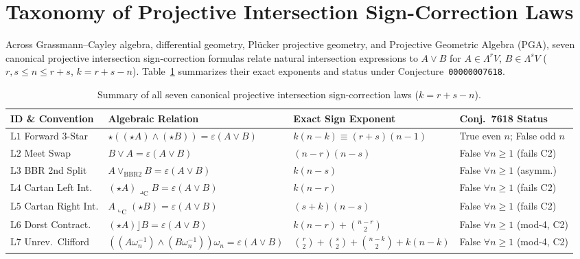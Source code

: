 \documentclass[11pt]{article}
\theoremstyle{definition}
\begin{document}
\section{Taxonomy of Projective Intersection Sign-Correction Laws}

Across Grassmann--Cayley algebra, differential geometry, Pl\"ucker projective geometry, and Projective Geometric Algebra (PGA), seven canonical projective intersection sign-correction formulas relate natural intersection expressions to $A \vee B$ for $A \in \Lambda^r V$, $B \in \Lambda^s V$ ($r, s \le n \le r + s$, $k = r + s - n$). Table~\ref{tab:taxonomy} summarizes their exact exponents and status under Conjecture~\texttt{00000007618}.

\begin{table}[htbp]
\centering
\footnotesize
\setlength{\tabcolsep}{3.5pt}
\renewcommand{\arraystretch}{1.22}
\begin{tabular}{@{}llll@{}}
\toprule
\textbf{ID \& Convention} & \textbf{Algebraic Relation} & \textbf{Exact Sign Exponent} & \textbf{Conj.\ 7618 Status} \\
\midrule
$\mathrm{L1}$ Forward 3-Star & $\star((\star A)\wedge(\star B)) = \varepsilon(A\vee B)$ & $k(n-k) \equiv (r+s)(n-1)$ & True even $n$; False odd $n$ \\
$\mathrm{L2}$ Meet Swap & $B \vee A = \varepsilon(A \vee B)$ & $(n-r)(n-s)$ & False $\forall n \ge 1$ (fails C2) \\
$\mathrm{L3}$ BBR 2nd Split & $A \vee_{\mathrm{BBR2}} B = \varepsilon(A \vee B)$ & $k(n-s)$ & False $\forall n \ge 1$ (asymm.) \\
$\mathrm{L4}$ Cartan Left Int. & $(\star A) \mathbin{\lrcorner_{\mathrm{C}}} B = \varepsilon(A \vee B)$ & $k(n-r)$ & False $\forall n \ge 1$ (fails C2) \\
$\mathrm{L5}$ Cartan Right Int. & $A \mathbin{\llcorner_{\mathrm{C}}} (\star B) = \varepsilon(A \vee B)$ & $(s+k)(n-s)$ & False $\forall n \ge 1$ (fails C2) \\
$\mathrm{L6}$ Dorst Contract. & $(\star A) \rfloor B = \varepsilon(A \vee B)$ & $k(n-r) + \binom{n-r}{2}$ & False $\forall n \ge 1$ (mod-4, C2) \\
$\mathrm{L7}$ Unrev.\ Clifford & $((A\omega_n^{-1})\wedge(B\omega_n^{-1}))\omega_n = \varepsilon(A\vee B)$ & $\binom{r}{2}+\binom{s}{2}+\binom{n-k}{2}+k(n-k)$ & False $\forall n \ge 1$ (mod-4, C2) \\
\bottomrule
\end{tabular}
\caption{Summary of all seven canonical projective intersection sign-correction laws ($k = r + s - n$).}\label{tab:taxonomy}
\end{table}
\end{document}
